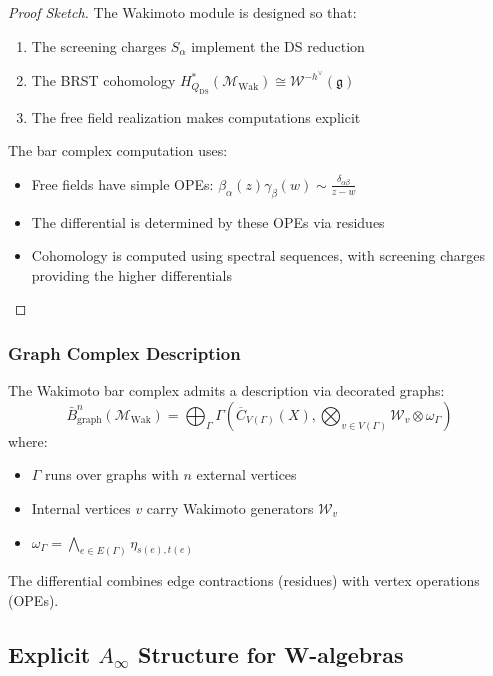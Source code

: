 \begin{proof}[Proof Sketch]
The Wakimoto module is designed so that:
\begin{enumerate}
\item The screening charges $S_\alpha$ implement the DS reduction
\item The BRST cohomology $H^*_{Q_{\text{DS}}}(\mathcal{M}_{\text{Wak}}) \cong \mathcal{W}^{-h^\vee}(\mathfrak{g})$
\item The free field realization makes computations explicit
\end{enumerate}
 
The bar complex computation uses:
\begin{itemize}
\item Free fields have simple OPEs: $\beta_\alpha(z)\gamma_\beta(w) \sim \frac{\delta_{\alpha\beta}}{z-w}$
\item The differential is determined by these OPEs via residues
\item Cohomology is computed using spectral sequences, with screening charges providing the higher differentials
\end{itemize}
\end{proof}
 
\subsubsection{Graph Complex Description}
 
\begin{proposition}
The Wakimoto bar complex admits a description via decorated graphs:
\[
\bar{B}^n_{\text{graph}}(\mathcal{M}_{\text{Wak}}) = \bigoplus_{\Gamma} 
\Gamma\left(\overline{C}_{V(\Gamma)}(X), \bigotimes_{v \in V(\Gamma)} \mathcal{W}_v \otimes \omega_\Gamma\right)
\]
where:
\begin{itemize}
\item $\Gamma$ runs over graphs with $n$ external vertices
\item Internal vertices $v$ carry Wakimoto generators $\mathcal{W}_v$
\item $\omega_\Gamma = \bigwedge_{e \in E(\Gamma)} \eta_{s(e),t(e)}$
\end{itemize}
The differential combines edge contractions (residues) with vertex operations (OPEs).
\end{proposition}
 
\subsection{Explicit $A_\infty$ Structure for W-algebras}
 
